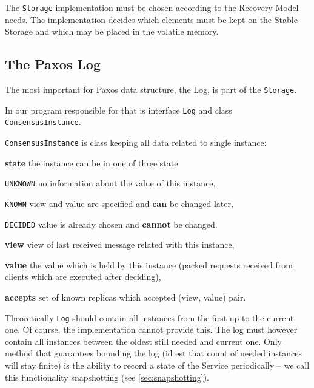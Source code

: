 \strut

The \texttt{Storage} implementation must be chosen according to the Recovery Model needs.
The implementation decides which elements must be kept on the Stable Storage and which may be placed in the volatile memory.

\subsection{The Paxos Log}
\label{subsec:the_paxos_log}
The most important for Paxos data structure, the Log, is part of the \texttt{Storage}.

In our program responsible for that is interface \texttt{Log} and class \texttt{Con\-sen\-susInstance}.

\texttt{ConsensusInstance} is class keeping all data related to single instance:
\begin{tightList}[\setlength{\itemindent}{0pt}\setlength{\leftmargin}{2\leftmargin}]
  \item[\textbf{state}] the instance can be in one of three state:
  \begin{tightList}[\setlength{\itemindent}{0pt} \setlength{\labelwidth}{7em}]
    \item[\texttt{\tiny UNKNOWN}] no information about the value of this instance,
    \item[\texttt{\tiny KNOWN}] view and value are specified and \textbf{can} be changed later,
    \item[\texttt{\tiny DECIDED}] value is already chosen and \textbf{cannot} be changed.
  \end{tightList}
  \item[\textbf{view}] view of last received message related with this instance,
  \item[\textbf{value}] the value which is held by this instance (packed requests received from clients which are executed after deciding),
  \item[\textbf{accepts}] set of known replicas which accepted (view, value) pair.
\end{tightList}

Theoretically \texttt{Log} should contain all instances from the first up to the current one. Of course, the implementation cannot provide this. The log must however contain all instances between the oldest still needed and current one. Only method that guarantees bounding the log (id est that count of needed instances will stay finite) is the ability to record a state of the Service periodically -- we call this functionality snapshotting (see \ref{sec:snapshotting}).

